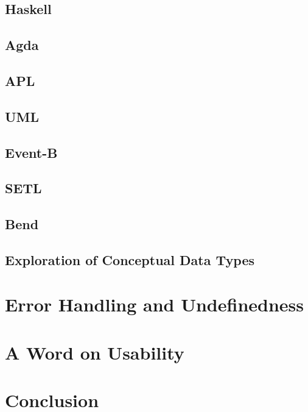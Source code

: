\documentclass{article}
\begin{document}
\subsection{Haskell}
\subsection{Agda}
\subsection{APL}
\subsection{UML}
\subsection{Event-B}
\subsection{SETL} %
\subsection{Bend} %
\subsection{Exploration of Conceptual Data Types}
\section{Error Handling and Undefinedness}
\section{A Word on Usability}
\section{Conclusion}


\nocite{*} %
\printbibliography %
\end{document}
